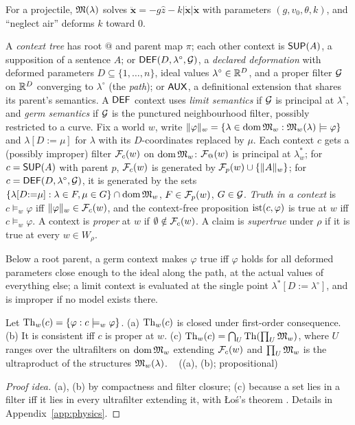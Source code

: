 For a projectile, $\mathfrak{M}(\lambda)$ solves $\ddot{\mathbf x}=-g\hat z-k|\dot{\mathbf
x}|\dot{\mathbf x}$ with parameters $(g,v_0,\theta,k)$, and ``neglect air'' deforms $k$
toward $0$.

\begin{definition}\label{def:physics:filter}
A \emph{context tree} has root $@$ and parent map $\pi$; each other context is
$\mathsf{SUP}(A)$, a supposition of a sentence $A$; or $\mathsf{DEF}(D,\lambda^\circ,\mathcal{G})$, a
\emph{declared deformation} with deformed parameters $D\subseteq\{1,\dots,n\}$, ideal
values $\lambda^\circ\in\mathbb{R}^D$, and a proper filter $\mathcal{G}$ on $\mathbb{R}^D$ converging to
$\lambda^\circ$ (the \emph{path}); or $\mathsf{AUX}$, a definitional extension that shares its
parent's semantics. A $\mathsf{DEF}$ context uses \emph{limit semantics} if $\mathcal{G}$ is principal at
$\lambda^\circ$, and \emph{germ semantics} if $\mathcal{G}$ is the punctured neighbourhood filter,
possibly restricted to a curve. Fix a world $w$, write
$\lVert \varphi\rVert_w=\{\lambda\in\operatorname{dom}\mathfrak{M}_w:\mathfrak{M}_w(\lambda)\models\varphi\}$ and
$\lambda[D{:=}\mu]$ for $\lambda$ with its $D$-coordinates replaced by $\mu$. Each context
$c$ gets a (possibly improper) filter $\mathcal{F}_c(w)$ on $\operatorname{dom}\mathfrak{M}_w$: $\mathcal{F}_@(w)$ is principal at
$\lambda^*_w$; for $c=\mathsf{SUP}(A)$ with parent $p$, $\mathcal{F}_c(w)$ is generated by
$\mathcal{F}_p(w)\cup\{\lVert A\rVert_w\}$; for $c=\mathsf{DEF}(D,\lambda^\circ,\mathcal{G})$, it is generated by the sets
$\{\lambda[D{:=}\mu]:\lambda\in F,\mu\in G\}\cap\operatorname{dom}\mathfrak{M}_w$, $F\in\mathcal{F}_p(w)$, $G\in\mathcal{G}$.
\emph{Truth in a context} is $c\models_w\varphi$ iff $\lVert \varphi\rVert_w\in\mathcal{F}_c(w)$, and the
context-free proposition $\mathrm{ist}(c,\varphi)$ is true at $w$ iff $c\models_w\varphi$. A context
is \emph{proper} at $w$ if $\emptyset\notin\mathcal{F}_c(w)$. A claim is \emph{supertrue} under
$\rho$ if it is true at every $w\in W_\rho$.
\end{definition}

Below a root parent, a germ context makes $\varphi$ true iff $\varphi$ holds for all
deformed parameters close enough to the ideal along the path, at the actual values of
everything else; a limit context is evaluated at the single point
$\lambda^*[D{:=}\lambda^\circ]$, and is improper if no model exists there.

\begin{proposition}\label{prop:physics:los}
Let $\mathrm{Th}_w(c)=\{\varphi:c\models_w\varphi\}$. \textup{(a)} $\mathrm{Th}_w(c)$ is closed under
first-order consequence. \textup{(b)} It is consistent iff $c$ is proper at $w$.
\textup{(c)} $\mathrm{Th}_w(c)=\bigcap_U\mathrm{Th}(\prod_U\mathfrak{M}_w)$, where $U$ ranges over the
ultrafilters on $\operatorname{dom}\mathfrak{M}_w$ extending $\mathcal{F}_c(w)$ and $\prod_U\mathfrak{M}_w$ is the ultraproduct of
the structures $\mathfrak{M}_w(\lambda)$.
\hfill{}\  ((a), (b); propositional)
\end{proposition}
\begin{proof}[Proof idea]
(a), (b) by compactness and filter closure; (c) because a set lies in a filter iff it lies
in every ultrafilter extending it, with \L{}o\'s's theorem \citep{los1955quelques}. Details
in Appendix~\ref{app:physics}.
\end{proof}

